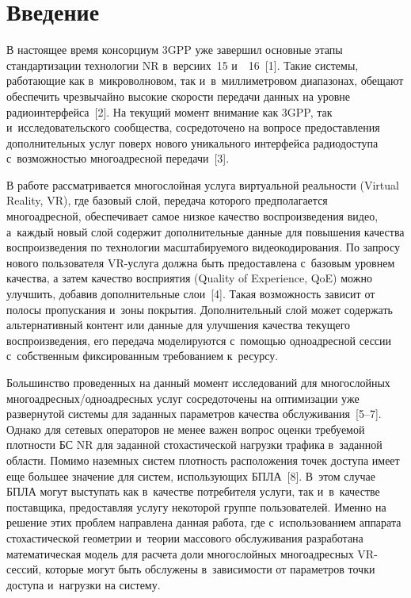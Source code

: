 \begin{multicols}{2}

\label{st\stat}
  
\section{Введение}
  
  В настоящее время консорциум 3GPP уже завершил основные этапы 
стандартизации технологии NR в~версиих~15 и~~16~[1]. Такие сис\-те\-мы, 
ра\-бо\-та\-ющие как в~микроволновом, так и~в~миллиметровом диапазонах, 
обещают обеспечить чрезвычайно высокие скорости передачи данных на 
уровне радиоинтерфейса~[2]. На текущий момент внимание как 3GPP, так 
и~исследовательского сообщества, сосредоточено на вопросе предоставления 
дополнительных услуг поверх нового уникального интерфейса радиодоступа 
с~возможностью многоадресной передачи~[3]. 
  
  В работе рассматривается многослойная услуга виртуальной реальности 
(Virtual Reality, VR), где базовый слой, передача которого предполагается 
многоадресной, обеспечивает самое низкое качество воспроизведения видео, 
а~каждый новый слой содержит дополнительные данные для повышения качества 
воспроизведения по технологии масштабируемого видеокодирования. По 
запросу нового пользователя VR-услу\-га должна быть предостав\-ле\-на с~базовым 
уровнем качества, а затем качество восприятия (Quality of Experience, QoE) 
можно улучшить, добавив дополнительные слои~[4]. Такая возможность 
зависит от полосы пропускания и~зоны покрытия. Дополнительный слой может 
содержать альтернативный контент или данные для улучшения качества 
текущего воспроизведения, его передача моделируются с~помощью 
одноадресной сессии с~собственным фиксированным требованием к~ресурсу. 
  
  Большинство проведенных на данный момент исследований для 
многослойных мно\-го\-ад\-рес\-ных/од\-но\-ад\-рес\-ных услуг сосредоточены 
на оптимизации уже развернутой системы для заданных параметров качества 
обслуживания~[5--7]. Однако для сетевых операторов не менее важен вопрос 
оценки требуемой плотности БС NR для заданной стохастической нагрузки 
трафика в~заданной об\-ласти. Помимо наземных сис\-тем плот\-ность 
расположения точек доступа имеет еще большее значение для сис\-тем, 
использующих БПЛА~[8]. В~этом случае БПЛА могут выступать как в~качестве 
потребителя услуги, так и~в~качестве поставщика, предоставляя услугу 
некоторой группе пользователей. Именно на решение этих проб\-лем направлена 
данная работа, где с~использованием аппарата стохастической 
геометрии и~тео\-рии массового обслуживания разработана математическая модель для 
расчета доли многослойных многоадресных VR-сес\-сий, которые могут быть 
обслужены в~зависимости от параметров точки доступа и~нагрузки на систему.


\end{multicols}
